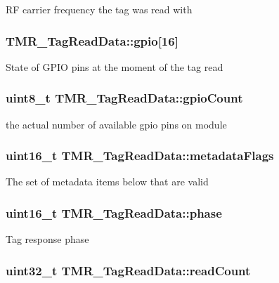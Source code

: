 RF carrier frequency the tag was read with \hypertarget{struct_t_m_r___tag_read_data_f1cab2080fc1ff9415a7aee6d39dfb8e}{
\subsubsection[{gpio}]{ {\bf TMR\_\-TagReadData::gpio}\mbox{[}16\mbox{]}}}
\label{struct_t_m_r___tag_read_data_f1cab2080fc1ff9415a7aee6d39dfb8e}


State of GPIO pins at the moment of the tag read \hypertarget{struct_t_m_r___tag_read_data_724e6cdb0c83b942f87af518b9baa55f}{
\subsubsection[{gpioCount}]{\setlength{\rightskip}{0pt plus 5cm}uint8\_\-t {\bf TMR\_\-TagReadData::gpioCount}}}
\label{struct_t_m_r___tag_read_data_724e6cdb0c83b942f87af518b9baa55f}


the actual number of available gpio pins on module \hypertarget{struct_t_m_r___tag_read_data_619c292691a22b067825674a8d0a3867}{
\subsubsection[{metadataFlags}]{\setlength{\rightskip}{0pt plus 5cm}uint16\_\-t {\bf TMR\_\-TagReadData::metadataFlags}}}
\label{struct_t_m_r___tag_read_data_619c292691a22b067825674a8d0a3867}


The set of metadata items below that are valid \hypertarget{struct_t_m_r___tag_read_data_6d7d9d9d7c209921f3e604ea27384576}{
\subsubsection[{phase}]{\setlength{\rightskip}{0pt plus 5cm}uint16\_\-t {\bf TMR\_\-TagReadData::phase}}}
\label{struct_t_m_r___tag_read_data_6d7d9d9d7c209921f3e604ea27384576}


Tag response phase \hypertarget{struct_t_m_r___tag_read_data_95c004dd01336df7165527d8aeba6cc5}{
\subsubsection[{readCount}]{\setlength{\rightskip}{0pt plus 5cm}uint32\_\-t {\bf TMR\_\-TagReadData::readCount}}}
\label{struct_t_m_r___tag_read_data_95c004dd01336df7165527d8aeba6cc5}


